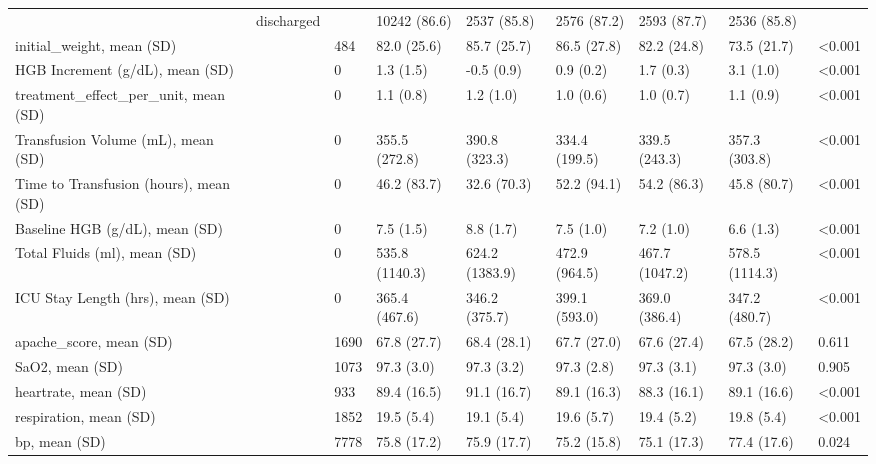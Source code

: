 \begin{tabular}{lllllllll}
{{{{{ & discharged &  & 10242 (86.6) & 2537 (85.8) & 2576 (87.2) & 2593 (87.7) & 2536 (85.8) &  \\
\cline{1-9}
initial_weight, mean (SD) &  & 484 & 82.0 (25.6) & 85.7 (25.7) & 86.5 (27.8) & 82.2 (24.8) & 73.5 (21.7) & <0.001 \\
\cline{1-9}
HGB Increment (g/dL), mean (SD) &  & 0 & 1.3 (1.5) & -0.5 (0.9) & 0.9 (0.2) & 1.7 (0.3) & 3.1 (1.0) & <0.001 \\
\cline{1-9}
treatment_effect_per_unit, mean (SD) &  & 0 & 1.1 (0.8) & 1.2 (1.0) & 1.0 (0.6) & 1.0 (0.7) & 1.1 (0.9) & <0.001 \\
\cline{1-9}
Transfusion Volume (mL), mean (SD) &  & 0 & 355.5 (272.8) & 390.8 (323.3) & 334.4 (199.5) & 339.5 (243.3) & 357.3 (303.8) & <0.001 \\
\cline{1-9}
Time to Transfusion (hours), mean (SD) &  & 0 & 46.2 (83.7) & 32.6 (70.3) & 52.2 (94.1) & 54.2 (86.3) & 45.8 (80.7) & <0.001 \\
\cline{1-9}
Baseline HGB (g/dL), mean (SD) &  & 0 & 7.5 (1.5) & 8.8 (1.7) & 7.5 (1.0) & 7.2 (1.0) & 6.6 (1.3) & <0.001 \\
\cline{1-9}
Total Fluids (ml), mean (SD) &  & 0 & 535.8 (1140.3) & 624.2 (1383.9) & 472.9 (964.5) & 467.7 (1047.2) & 578.5 (1114.3) & <0.001 \\
\cline{1-9}
ICU Stay Length (hrs), mean (SD) &  & 0 & 365.4 (467.6) & 346.2 (375.7) & 399.1 (593.0) & 369.0 (386.4) & 347.2 (480.7) & <0.001 \\
\cline{1-9}
apache_score, mean (SD) &  & 1690 & 67.8 (27.7) & 68.4 (28.1) & 67.7 (27.0) & 67.6 (27.4) & 67.5 (28.2) & 0.611 \\
\cline{1-9}
SaO2, mean (SD) &  & 1073 & 97.3 (3.0) & 97.3 (3.2) & 97.3 (2.8) & 97.3 (3.1) & 97.3 (3.0) & 0.905 \\
\cline{1-9}
heartrate, mean (SD) &  & 933 & 89.4 (16.5) & 91.1 (16.7) & 89.1 (16.3) & 88.3 (16.1) & 89.1 (16.6) & <0.001 \\
\cline{1-9}
respiration, mean (SD) &  & 1852 & 19.5 (5.4) & 19.1 (5.4) & 19.6 (5.7) & 19.4 (5.2) & 19.8 (5.4) & <0.001 \\
\cline{1-9}
bp, mean (SD) &  & 7778 & 75.8 (17.2) & 75.9 (17.7) & 75.2 (15.8) & 75.1 (17.3) & 77.4 (17.6) & 0.024 \\
\cline{1-9}
\bottomrule
\end{tabular}
